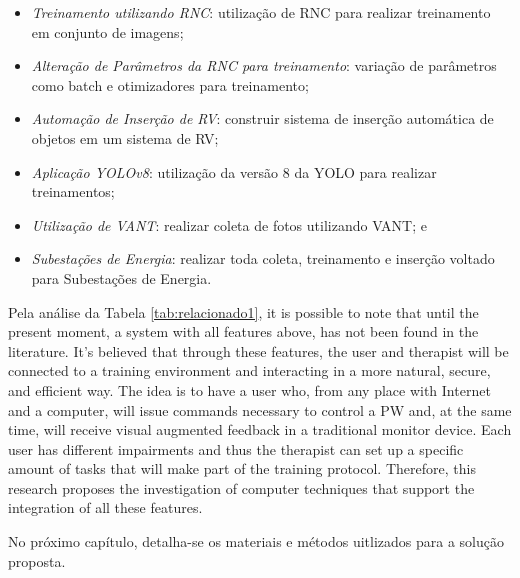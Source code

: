 \begin{itemize}
\item \textit{Treinamento utilizando RNC}: utilização de RNC para realizar treinamento em conjunto de imagens;
\item \textit{Alteração de Parâmetros da RNC para treinamento}: variação de parâmetros como batch e otimizadores para treinamento;
\item \textit{Automação de Inserção de RV}: construir sistema de inserção automática de objetos em um sistema de RV;
\item \textit{Aplicação YOLOv8}: utilização da versão 8 da YOLO para realizar treinamentos;
\item \textit{Utilização de VANT}: realizar coleta de fotos utilizando VANT; e
\item \textit{Subestações de Energia}: realizar toda coleta, treinamento e inserção voltado para Subestações de Energia. 
\end{itemize}
    
Pela análise da Tabela \ref{tab:relacionado1}, it is possible to note that until the present moment, a system with all features above, has not been found in the literature. It's believed that through these features, the user and therapist will be connected to a training environment and interacting in a more natural, secure, and efficient way. The idea is to have a user who, from any place with Internet and a computer, will issue commands necessary to control a PW and, at the same time, will receive visual augmented feedback in a traditional monitor device. Each user has different impairments and thus the therapist can set up a specific amount of tasks that will make part of the training protocol.  Therefore, this research proposes the investigation of computer techniques that support the integration of all these features.

No próximo capítulo, detalha-se os materiais e métodos uitlizados para a solução proposta.

